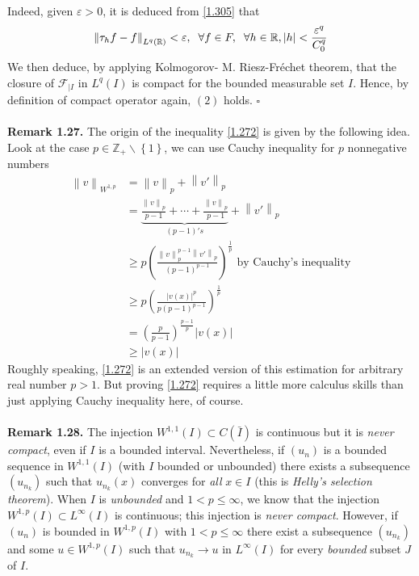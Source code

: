 \documentclass[a4paper,oneside]{book}
\numberwithin{equation}{chapter}
\begin{document}
Indeed, given $\varepsilon >0$, it is deduced from \eqref{1.305} that
\begin{align}
{\left\| {{\tau _h}f - f} \right\|_{{L^q}\left( \mathbb{R} \right)}} < \varepsilon ,\hspace{0.2cm}\forall f \in F,\hspace{0.2cm}\forall h \in \mathbb{R},\left| h \right| < \frac{{{\varepsilon ^q}}}{{C_0^q}}
\end{align}
We then deduce, by applying Kolmogorov- M. Riesz-Fr\'{e}chet theorem, that the closure of ${\mathcal{F}_{\left| I \right.}}$ in $L^q\left(I\right)$ is compact for the bounded measurable set $I$. Hence, by definition of compact operator again, $\left(2\right)$ holds. \hfill $\square$\\
\\
\textbf{Remark 1.27.} The origin of the inequality \eqref{1.272} is given by the following idea. Look at the case $p \in {\mathbb{Z}_ + }\backslash \left\{ 1 \right\}$, we can use Cauchy inequality for $p$ nonnegative numbers
\begin{align}
{\left\| v \right\|_{{W^{1,p}}}} &= {\left\| v \right\|_p} + {\left\| {v'} \right\|_p}\\
& = \underbrace {\frac{{{{\left\| v \right\|}_p}}}{{p - 1}} +  \cdots  + \frac{{{{\left\| v \right\|}_p}}}{{p - 1}}}_{\left( {p - 1} \right)'s} + {\left\| {v'} \right\|_p}\\
& \ge p{\left( {\frac{{\left\| v \right\|_p^{p - 1}{{\left\| {v'} \right\|}_p}}}{{{{\left( {p - 1} \right)}^{p - 1}}}}} \right)^{\frac{1}{p}}}\mbox{ by Cauchy's inequality}\\
& \ge p{\left( {\frac{{{{\left| {v\left( x \right)} \right|}^p}}}{{p{{\left( {p - 1} \right)}^{p - 1}}}}} \right)^{\frac{1}{p}}}\\
& = {\left( {\frac{p}{{p - 1}}} \right)^{\frac{{p - 1}}{p}}}\left| {v\left( x \right)} \right|\\
& \ge \left| {v\left( x \right)} \right|
\end{align}
Roughly speaking, \eqref{1.272} is an extended version of this estimation for arbitrary real number $p>1$. But proving \eqref{1.272} requires a little more calculus skills than just applying Cauchy inequality here, of course.\\
\\
\textbf{Remark 1.28.} The injection $W^{1,1}\left(I\right) \subset C\left(\bar{I}\right)$ is continuous but it is \textit{never compact}, even if $I$ is a bounded interval. Nevertheless, if $\left(u_n\right)$ is a bounded sequence in $W^{1,1}\left(I\right)$ (with $I$ bounded or unbounded) there exists a subsequence $\left(u_{n_k}\right)$ such that $u_{n_k}\left(x\right)$ converges for \textit{all} $x\in I$ (this is \textit{Helly's selection theorem}). When $I$ is \textit{unbounded} and $1<p\le \infty$, we know that the injection $W^{1,p}\left(I\right)\subset L^{\infty}\left(I\right)$ is continuous; this injection is \textit{never compact}. However, if $\left(u_n\right)$ is bounded in $W^{1,p}\left(I\right)$ with $1<p\le \infty$ there exist a subsequence $\left(u_{n_k}\right)$ and some $u\in W^{1,p}\left(I\right)$ such that $u_{n_k}\to u$ in $L^{\infty}\left(I\right)$ for every \textit{bounded} subset $J$ of $I$.\\
\end{document}
